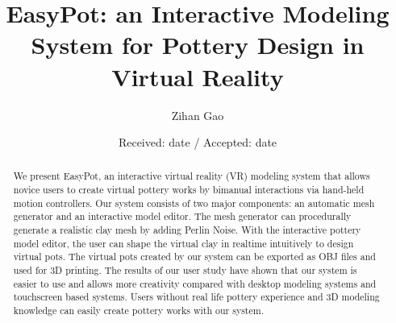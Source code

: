 \documentclass{svjour3}                     %
\begin{document}
\title{EasyPot: an Interactive Modeling System for Pottery Design in Virtual Reality%
}


\author{Zihan Gao         %
}



\date{Received: date / Accepted: date}


\maketitle

\begin{abstract}
We present EasyPot, an interactive virtual reality (VR) modeling system that allows novice users to create virtual pottery works by bimanual interactions via hand-held motion controllers.
Our system consists of two major components: an automatic mesh generator and an interactive model editor.
The mesh generator can procedurally generate a realistic clay mesh by adding Perlin Noise. With the interactive pottery model editor, the user can shape the virtual clay in realtime intuitively to design virtual pots.
The virtual pots created by our system can be exported as OBJ files and used for 3D printing.
The results of our user study have shown that our system is easier to use and allows more creativity compared with desktop modeling systems and touchscreen based systems. Users without real life pottery experience and 3D modeling knowledge can easily create pottery works with our system.

\end{abstract}
\end{document}
